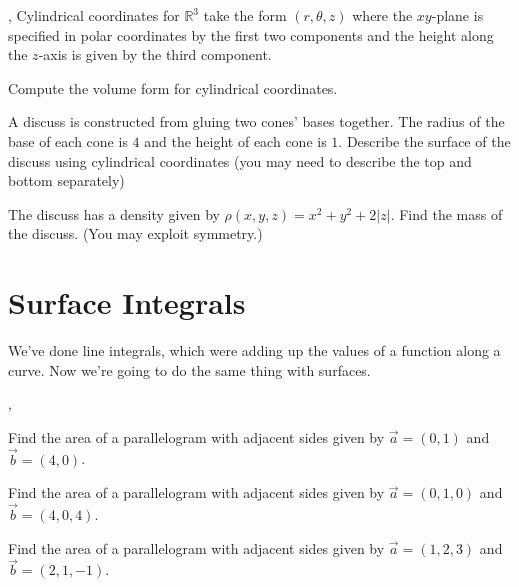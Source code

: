 \documentclass[letter]{article}
\newcommand{\R}{\mathbb{R}}
\newcommand{\sepl}{\sep \vspace{-.35in}}
\begin{document}
	\sep
	Cylindrical coordinates for $\R^3$ take the form $(r,\theta, z)$ where the
	$xy$-plane is specified in polar coordinates by the first two components
	and the height along the $z$-axis
	is given by the third component.
	\begin{Enum}
		\item Compute the volume form for cylindrical coordinates.
		\item A discuss is constructed from gluing two cones' bases together.
			The radius of the base of each cone is $4$ and the height of each
			cone is $1$.  Describe the surface of the discuss using cylindrical coordinates
			(you may need to describe the top and bottom separately)
		\item The discuss has a density given by $\rho(x,y,z) = x^2+y^2+2|z|$.  Find the
			mass of the discuss. (You may exploit symmetry.)
	\end{Enum}

\newpage
\section*{Surface Integrals}
	We've done line integrals, which were adding up the values of a function along a curve.
	Now we're going to do the same thing with surfaces.

	\sepl
	\begin{Enum}
		\item Find the area of a parallelogram with adjacent sides given by $\vec a=(0,1)$ and $\vec b=(4,0)$.
		\item Find the area of a parallelogram with adjacent sides given by $\vec a=(0,1,0)$ and $\vec b=(4,0,4)$.
		\item Find the area of a parallelogram with adjacent sides given by $\vec a=(1,2,3)$ and $\vec b=(2,1,-1)$.
	\end{Enum}
\end{document}
